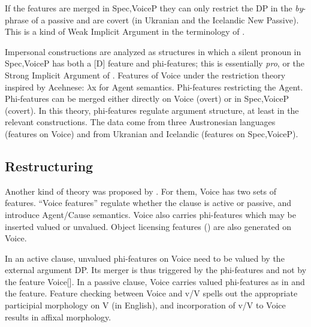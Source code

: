 If the features are merged in Spec,VoiceP they can only restrict the DP in the \emph{by}-phrase of a passive and are covert (in Ukranian and the Icelandic New Passive). This is a kind of Weak Implicit Argument in the terminology of \cite{landau10}.

Impersonal constructions are analyzed as structures in which a silent pronoun in Spec,VoiceP has both a [D] feature and phi-features; this is essentially \textit{pro}, or the Strong Implicit Argument of \cite{landau10}.
\pex Features of Voice under the restriction theory inspired by Acehnese:
	\a $\lambda$x for Agent semantics.
	\a Phi-features restricting the Agent.
	\a Phi-features can be merged either directly on Voice (overt) or in Spec,VoiceP (covert).
\xe
In this theory, phi-features regulate argument structure, at least in the relevant constructions. The data come from three Austronesian languages (features on Voice) and from Ukranian and Icelandic (features on Spec,VoiceP).

	\subsection{Restructuring}
Another kind of theory was proposed by \cite{wurmbrandshimamura17}. For them, Voice has two sets of features. ``Voice features'' regulate whether the clause is active or passive, and introduce Agent/Cause semantics. Voice also carries phi-features which may be inserted valued or unvalued. Object licensing features () are also generated on Voice.

In an active clause, unvalued phi-features on Voice need to be valued by the external argument DP. Its merger is thus triggered by the phi-features and not by the feature Voice[]. In a passive clause, Voice carries valued phi-features as in \cite{legate14} and the  feature. Feature checking between Voice and v/V spells out the appropriate participial morphology on V (in English), and incorporation of v/V to Voice results in affixal morphology.

